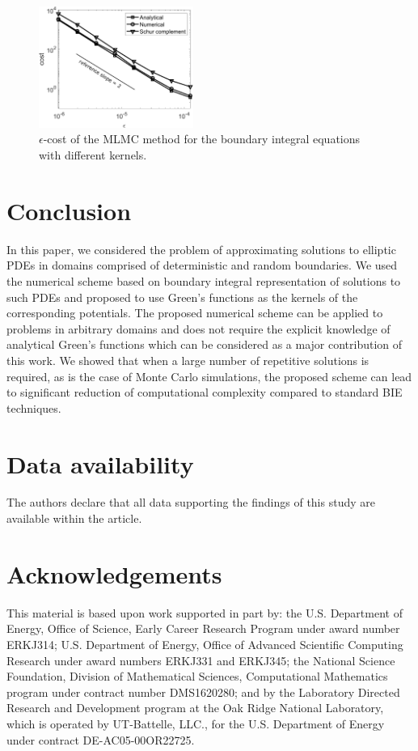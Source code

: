 \begin{figure}[!t]
	\centering
    \includegraphics[width=0.45\textwidth]{images/MLMC_cost}
	\caption{ $\epsilon$-cost of the MLMC method for the boundary integral equations with different kernels.}
	\label{fig:mlmc_cost}
\end{figure}


\section{Conclusion}

In this paper, we considered the problem of approximating solutions to elliptic PDEs in domains comprised of deterministic and random boundaries.
We used the numerical scheme based on boundary integral representation of solutions to such PDEs and proposed to use Green's functions as the kernels of the corresponding potentials.
The proposed numerical scheme can be applied to problems in arbitrary domains  and does not require the explicit knowledge of analytical Green's functions which can be considered as a major contribution of this work.
We showed that when a large number of repetitive solutions is required, as is the case of Monte Carlo simulations, the proposed scheme can lead to significant reduction of computational complexity compared to standard BIE techniques.


\section*{Data availability}

The authors declare that all data supporting the findings of this study are available within the article.

\section*{Acknowledgements}

This material is based upon work supported in part by: the U.S. Department of Energy, Office of Science, Early Career Research Program under 
award number ERKJ314; U.S. Department of Energy, Office of Advanced Scientific Computing Research under award numbers ERKJ331 and ERKJ345; 
the National Science Foundation, Division of Mathematical Sciences, Computational Mathematics program under contract number DMS1620280;
and by the Laboratory Directed Research and Development program at the Oak Ridge National Laboratory, which is operated by UT-Battelle, LLC., 
for the U.S. Department of Energy under contract DE-AC05-00OR22725.


